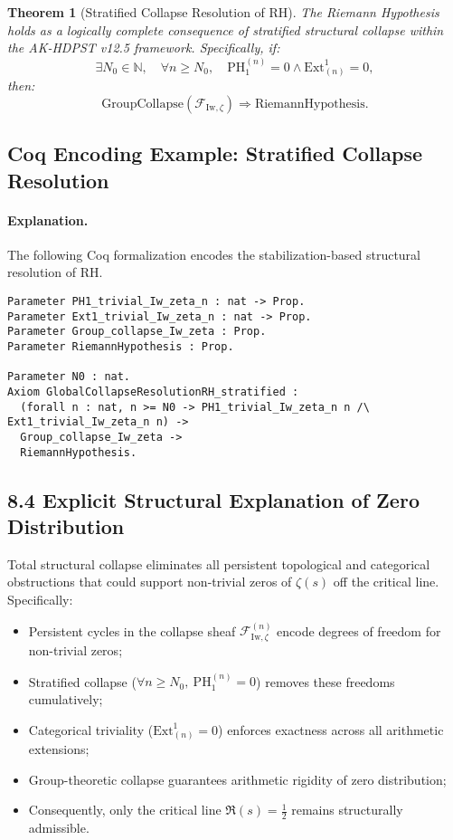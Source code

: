 \documentclass[11pt]{article}
\newtheorem{theorem}{Theorem}[section]
\begin{document}
\begin{theorem}[Stratified Collapse Resolution of RH]
The Riemann Hypothesis holds as a logically complete consequence of stratified structural collapse within the AK-HDPST v12.5 framework. Specifically, if:
\[
\exists N_0 \in \mathbb{N}, \quad \forall n \geq N_0, \quad \mathrm{PH}_1^{(n)} = 0 \wedge \mathrm{Ext}^1_{(n)} = 0,
\]
then:
\[
\mathrm{GroupCollapse}(\mathcal{F}_{\mathrm{Iw}, \zeta}) \Rightarrow \mathrm{RiemannHypothesis}.
\]
\end{theorem}

\subsection*{Coq Encoding Example: Stratified Collapse Resolution}

\paragraph{Explanation.}
The following Coq formalization encodes the stabilization-based structural resolution of RH.

\begin{lstlisting}[language=Coq, caption=Stratified Collapse Resolution of RH, captionpos=b]
Parameter PH1_trivial_Iw_zeta_n : nat -> Prop.
Parameter Ext1_trivial_Iw_zeta_n : nat -> Prop.
Parameter Group_collapse_Iw_zeta : Prop.
Parameter RiemannHypothesis : Prop.

Parameter N0 : nat.
Axiom GlobalCollapseResolutionRH_stratified :
  (forall n : nat, n >= N0 -> PH1_trivial_Iw_zeta_n n /\ Ext1_trivial_Iw_zeta_n n) ->
  Group_collapse_Iw_zeta ->
  RiemannHypothesis.
\end{lstlisting}

\subsection*{8.4 Explicit Structural Explanation of Zero Distribution}

Total structural collapse eliminates all persistent topological and categorical obstructions that could support non-trivial zeros of $\zeta(s)$ off the critical line. Specifically:

\begin{itemize}
    \item Persistent cycles in the collapse sheaf $\mathcal{F}_{\mathrm{Iw}, \zeta}^{(n)}$ encode degrees of freedom for non-trivial zeros;
    \item Stratified collapse ($\forall n \geq N_0, \ \mathrm{PH}_1^{(n)} = 0$) removes these freedoms cumulatively;
    \item Categorical triviality ($\mathrm{Ext}^1_{(n)} = 0$) enforces exactness across all arithmetic extensions;
    \item Group-theoretic collapse guarantees arithmetic rigidity of zero distribution;
    \item Consequently, only the critical line $\Re(s) = \tfrac{1}{2}$ remains structurally admissible.
\end{itemize}
\end{document}
